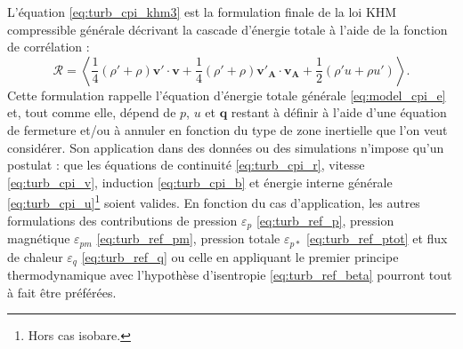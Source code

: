L'équation \eqref{eq:turb_cpi_khm3} est la formulation finale de la loi \acs{KHM} compressible générale décrivant la cascade d'énergie totale à l'aide de la fonction de corrélation :  
\begin{equation*}
    \mathcal{R} = \left<\frac{1}{4} \left(\rho'+\rho\right) \boldsymbol{v'} \cdot  \boldsymbol{v} + \frac{1}{4} \left(\rho'+\rho\right) \boldsymbol{v'_A} \cdot  \boldsymbol{v_A} +\frac{1}{2} \left(\rho' u + \rho u'\right)\right>.
\end{equation*}
Cette formulation rappelle l'équation d'énergie totale générale \eqref{eq:model_cpi_e} et, tout comme elle, dépend de $p$, $u$ et $\boldsymbol{q}$ restant à définir à l'aide d'une équation de fermeture et/ou à annuler en fonction du type de zone inertielle que l'on veut considérer. Son application dans des données ou des simulations n'impose qu'un postulat : que les équations de continuité \eqref{eq:turb_cpi_r}, vitesse \eqref{eq:turb_cpi_v}, induction \eqref{eq:turb_cpi_b} et énergie interne générale \eqref{eq:turb_cpi_u}\footnote{Hors cas isobare.} soient valides. En fonction du cas d'application, les autres formulations des contributions de pression $\varepsilon_p$ \eqref{eq:turb_ref_p}, pression magnétique $\varepsilon_{pm}$ \eqref{eq:turb_ref_pm}, pression totale $\varepsilon_{p*}$ \eqref{eq:turb_ref_ptot} et flux de chaleur $\varepsilon_q$ \eqref{eq:turb_ref_q} ou celle en appliquant le premier principe thermodynamique avec l'hypothèse d'isentropie \eqref{eq:turb_ref_beta} pourront tout à fait être préférées.

